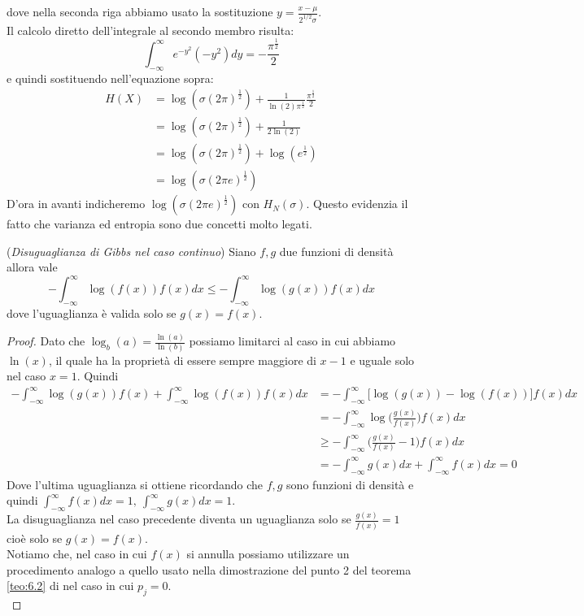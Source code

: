 dove nella seconda riga abbiamo usato la sostituzione $y=\frac{x-\mu}{2^{1/2}\sigma}$.\\
Il calcolo diretto dell'integrale al secondo membro risulta:
$$\int_{-\infty}^{\infty} e^{-y^2}(-y^2) dy= - \frac{\pi^{\frac{1}{2}}}{2}$$
e quindi sostituendo nell'equazione sopra:
\begin{equation}
\begin{split}
H(X)&=\log (\sigma (2\pi)^{\frac{1}{2}})+\frac{1}{\ln(2) \pi^{\frac{1}{2}}}\frac{\pi^{\frac{1}{2}}}{2}\\
&=\log (\sigma (2\pi)^{\frac{1}{2}})+\frac{1}{2 \ln(2)} \\
&=\log (\sigma (2\pi)^{\frac{1}{2}})+ \log (e^{\frac{1}{2}}) \\
&=\log ( \sigma (2\pi e)^{\frac{1}{2}})
\end{split}
\end{equation}
D'ora in avanti indicheremo $\log(\sigma(2\pi e)^{\frac{1}{2}})$ con $H_N(\sigma)$. Questo evidenzia il fatto che varianza ed entropia sono due concetti molto legati.

\begin{teo}\label{teo:GibbsContinuo}(\textit{Disuguaglianza di Gibbs nel caso continuo})
Siano $f,g$ due funzioni di densità allora vale
\begin{equation}
-\int_{-\infty}^{\infty} \log(f(x))f(x)dx \leq - \int_{-\infty}^{\infty} \log(g(x))f(x)dx
\end{equation}
dove l'uguaglianza è valida solo se $g(x)=f(x)$.
\end{teo}
\begin{proof}
Dato che $\log_b(a)=\frac{\ln (a)}{\ln (b)}$ possiamo limitarci al caso in cui abbiamo $\ln(x)$, il quale ha la proprietà di essere sempre maggiore di $x-1$ e uguale solo nel caso $x=1$. Quindi
\[
\begin{split}
- \int_{-\infty}^{\infty} \log(g(x))f(x) +  \int_{-\infty}^{\infty} \log(f(x))f(x)dx & = - \int_{-\infty}^{\infty} \bigg[\log(g(x))-\log(f(x))\bigg] f(x)dx \\
& =-\int_{-\infty}^{\infty} \log \bigg(\frac{g(x)}{f(x)}\bigg)f(x)dx\\
& \geq  -\int_{-\infty}^{\infty} \bigg(\frac{g(x)}{f(x)} -1\bigg)f(x)dx\\
&= -\int_{-\infty}^{\infty} g(x)dx +\int_{-\infty}^{\infty} f(x)dx=0
\end{split}
\]
Dove l'ultima uguaglianza si ottiene ricordando che $f,g$ sono funzioni di densità e quindi $\int_{-\infty}^{\infty} f(x)dx=1, \ \int_{-\infty}^{\infty} g(x)dx=1$.\\
La disuguaglianza nel caso precedente diventa un uguaglianza solo se $\frac{g(x)}{f(x)}=1$ cioè solo se $g(x)=f(x)$.\\
Notiamo che, nel caso in cui $f(x)$ si annulla possiamo utilizzare un procedimento analogo a quello usato nella dimostrazione del punto 2 del teorema \ref{teo:6.2} di nel caso in cui $p_j=0$.\\
\end{proof}


